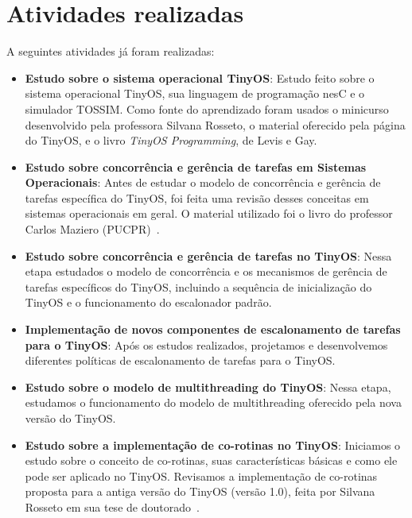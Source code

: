 \documentclass[a4paper, 10pt]{article}
\begin{document}
\section{Atividades realizadas}\label{atividades}
A seguintes atividades já foram realizadas:
\begin{itemize}
\item {\bf Estudo sobre o sistema operacional TinyOS}:
Estudo feito sobre o sistema operacional TinyOS, sua linguagem de programação nesC e o simulador TOSSIM.
Como fonte do aprendizado foram usados o minicurso desenvolvido pela 
professora Silvana Rosseto\cite{Rossetto/10}, o material oferecido
pela página do TinyOS\cite{tinyos}, e o livro \textit{TinyOS Programming}, de Levis e Gay\cite{LevisGay/09}.

\item {\bf Estudo sobre concorrência e gerência de tarefas em Sistemas Operacionais}:
Antes de estudar o modelo de concorrência e gerência de tarefas específica do TinyOS, 
foi feita uma revisão desses conceitas em sistemas operacionais em geral. 
O material utilizado foi o livro do professor Carlos Maziero (PUCPR)~\cite{Maziero/11}.

\item {\bf Estudo sobre concorrência e gerência de tarefas no TinyOS}:
Nessa etapa estudados o modelo de concorrência e os mecanismos de gerência 
de tarefas específicos do TinyOS, incluindo a sequência de inicialização do
TinyOS e o funcionamento do escalonador padrão.

\item {\bf Implementação de novos componentes de escalonamento de tarefas para o TinyOS}:
Após os estudos realizados, projetamos e desenvolvemos diferentes políticas de escalonamento
de tarefas para o TinyOS.

\item {\bf Estudo sobre o modelo de multithreading do TinyOS}:
Nessa etapa, estudamos o funcionamento do modelo de multithreading oferecido pela nova versão do TinyOS.

\item{\bf Estudo sobre a implementação de co-rotinas no TinyOS}:
Iniciamos o estudo sobre o conceito de co-rotinas, suas características básicas  e como ele 
pode ser  aplicado no TinyOS. Revisamos a implementação de co-rotinas proposta para a antiga versão do 
TinyOS (versão 1.0), feita por Silvana Rosseto em sua tese de doutorado~\cite{Rossetto/06}.

\end{itemize}
\end{document}
